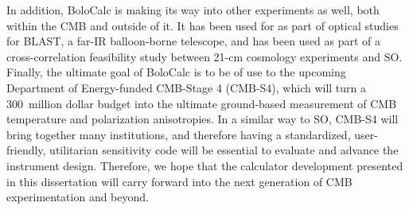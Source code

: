 In addition, BoloCalc is making its way into other experiments as well, both within the CMB and outside of it. It has been used for as part of optical studies for BLAST, a far-IR balloon-borne telescope, and has been used as part of a cross-correlation feasibility study between 21-cm cosmology experiments and SO. Finally, the ultimate goal of BoloCalc is to be of use to the upcoming Department of Energy-funded CMB-Stage 4 (CMB-S4), which will turn a 300~million dollar budget into the ultimate ground-based measurement of CMB temperature and polarization anisotropies. In a similar way to SO, CMB-S4 will bring together many institutions, and therefore having a standardized, user-friendly, utilitarian sensitivity code will be essential to evaluate and advance the instrument design. Therefore, we hope that the calculator development presented in this dissertation will carry forward into the next generation of CMB experimentation and beyond.